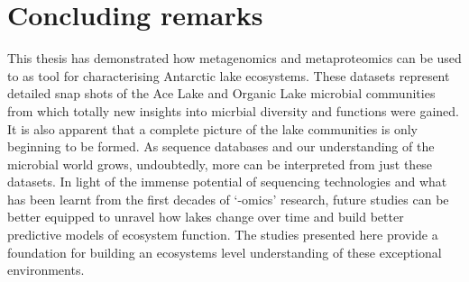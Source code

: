 %

\section{Concluding remarks}
This thesis has demonstrated how metagenomics and metaproteomics can be used to as tool for characterising Antarctic lake ecosystems.
These datasets represent detailed snap shots of the Ace Lake and Organic Lake microbial communities from which totally new insights into micrbial diversity and functions were gained.
It is also apparent that a complete picture of the lake communities is only beginning to be formed.
As sequence databases and our understanding of the microbial world grows, undoubtedly, more can be interpreted from just these datasets.
In light of the immense potential of sequencing technologies and what has been learnt from the first decades of `-omics' research, future studies can be better equipped to unravel how lakes change over time and build better predictive models of ecosystem function.  
The studies presented here provide a foundation for building an ecosystems level understanding of these exceptional environments.
